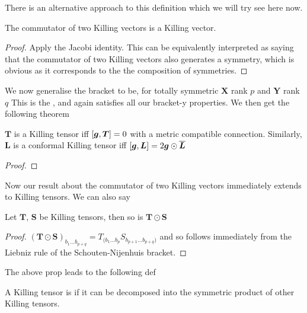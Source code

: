 \documentclass{article}
\begin{document}
There is an alternative approach to this definition which we will try see here now. 
\begin{lemma}
The commutator of two Killing vectors is a Killing vector.
\end{lemma}
\begin{proof}
Apply the Jacobi identity. This can be equivalently interpreted as saying that the commutator of two Killing vectors also generates a symmetry, which is obvious as it corresponds to the the composition of symmetries.  
\end{proof}
We now generalise the bracket to be, for totally symmetric $\bm{X}$ rank $p$ and $\bm{Y}$ rank $q$
This is the , and again satisfies all our bracket-y properties. We then get the following theorem 
\begin{theorem}
$\bm{T}$ is a Killing tensor iff $\comm[\bm{g}]{\bm{T}}=0$ with a metric compatible connection. Similarly, $\bm{L}$ is a conformal Killing tensor iff $\comm[\bm{g}]{\bm{L}} = 2\bm{g} \odot \bar{\bm{L}}$
\end{theorem}
\begin{proof}
\end{proof}
Now our result about the commutator of two Killing vectors immediately extends to Killing tensors. We can also say 
\begin{prop}
Let $\bm{T}$, $\bm{S}$ be Killing tensors, then so is $\bm{T} \odot \bm{S}$
\end{prop}
\begin{proof}
$(\bm{T} \odot \bm{S})_{b_1 \dots b_{p+q}} = T_{(b_1 \dots b_p}S_{b_{p+1}\dots b_{p+q})}$ and so follows immediately from the Liebniz rule of the Schouten-Nijenhuis bracket.
\end{proof}

The above prop leads to the following def
\begin{definition}
A Killing tensor is  if it can be decomposed into the symmetric product of other Killing tensors.
\end{definition}
\end{document}
